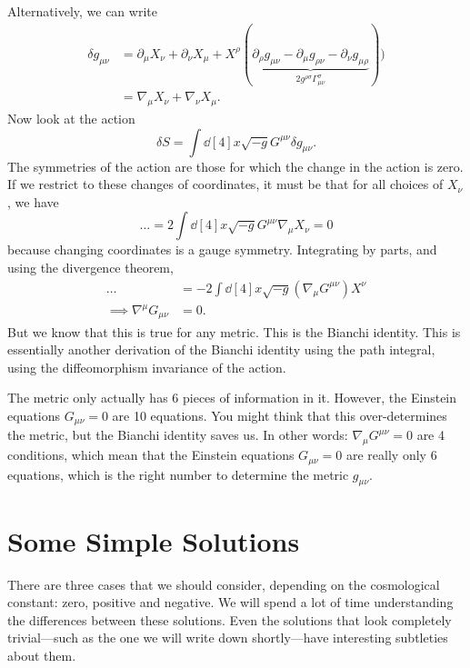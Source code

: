 Alternatively, we can write 
\begin{align}
  \delta g_{\mu\nu} &= \partial_{\mu} X_{\nu} + \partial_{\nu} X_{\mu} + X^{\rho}(\underbrace{\partial_{\rho} g_{\mu\nu} - \partial_{\mu} g_{\rho\nu} - \partial_{\nu} g_{\mu\rho}}_{2 g^{\rho\sigma} \Gamma^{\sigma}_{\mu\nu}})) \\
		    &= \nabla_{\mu} X_{\nu} + \nabla_{\nu} X_{\mu}.
\end{align}
Now look at the action
\begin{equation}
  \delta S = \int \dd[4]{x} \sqrt{-g} G^{\mu\nu} \delta g_{\mu\nu}.
\end{equation}
The symmetries of the action are those for which the change in the action is zero.
If we restrict to these changes of coordinates, it must be that for all choices of $X_{\nu}$, we have
\begin{equation}
  \dots = 2 \int \dd[4]{x} \sqrt{-g} G^{\mu\nu} \nabla_{\mu} X_{\nu} = 0
\end{equation}
because changing coordinates is a gauge symmetry.
Integrating by parts, and using the divergence theorem,
\begin{align}
  \dots &= -2 \int \dd[4]{x} \sqrt{-g} (\nabla_{\mu} G^{\mu\nu}) X^{\nu} \\
  \implies \nabla^{\mu} G_{\mu\nu} &= 0.
\end{align}
But we know that this is true for any metric. This is the Bianchi identity.
This is essentially another derivation of the Bianchi identity using the path integral, using the diffeomorphism invariance of the action.
\begin{leftbar}
  \begin{remark}
    The metric only actually has 6 pieces of information in it. However, the Einstein equations $G_{\mu\nu} = 0$ are 10 equations. You might think that this over-determines the metric, but the Bianchi identity saves us.
    In other words: $\nabla_{\mu} G^{\mu\nu} = 0$ are 4 conditions, which mean that the Einstein equations $G_{\mu\nu} = 0$ are really only 6 equations, which is the right number to determine the metric $g_{\mu\nu}$.
  \end{remark}
\end{leftbar}

\section{Some Simple Solutions}%
\label{sec:some_simple_solutions}

There are three cases that we should consider, depending on the cosmological constant: zero, positive and negative.
We will spend a lot of time understanding the differences between these solutions. Even the solutions that look completely trivial---such as the one we will write down shortly---have interesting subtleties about them.

